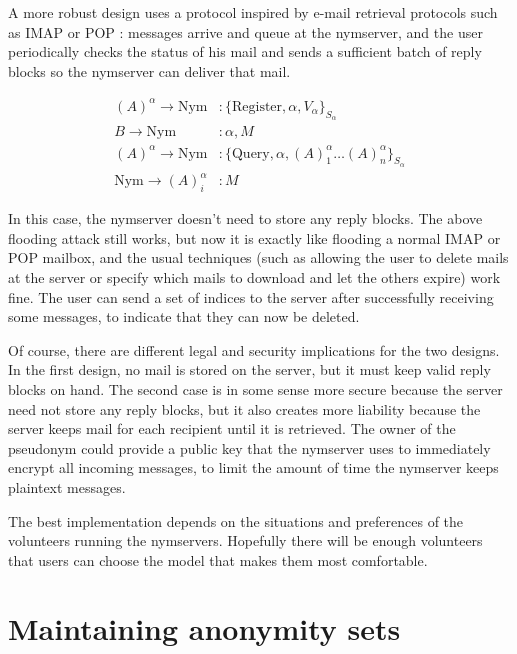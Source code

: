 \documentclass[11pt]{IEEEtran}
\begin{document}
A more robust design uses a protocol inspired by e-mail retrieval
protocols such as IMAP \cite{IMAP} or POP \cite{POP3}:
messages arrive and queue at the nymserver, and the user periodically
checks the status of his mail and sends a sufficient batch of reply
blocks so the nymserver can deliver that mail.

\begin{equation}
\begin{aligned}
(A)^\alpha \rightarrow \mathrm{Nym}&: \{\mathrm{Register} , \alpha, V_{\alpha}\}_{S_{\alpha}}\\
B \rightarrow \mathrm{Nym}&: \alpha, M \\
(A)^\alpha \rightarrow \mathrm{Nym}&: \{\mathrm{Query} ,\alpha, (A)^\alpha_1 \dots
(A)^\alpha_n\}_{S_{\alpha}} \\
\mathrm{Nym} \rightarrow (A)^\alpha_i&: M
\end{aligned}
\end{equation}

In this case, the nymserver doesn't need to store any reply blocks.
The above flooding attack still works, but now it is exactly
like flooding a normal IMAP or POP mailbox, and the usual techniques (such as
allowing the user to delete mails at the server or specify which mails to
download and let the others expire) work fine. The user can send a set
of indices to the server after successfully receiving
some messages, to indicate that they can now be deleted.

Of course, there are different legal and security implications for the two
designs. In the first design, no mail is stored on the server, but it must
keep valid reply blocks on hand. The second case is in some sense more
secure because the server need not store any reply blocks, but it also
creates more liability because the server keeps mail for each recipient
until it is retrieved. The owner of the pseudonym could provide a public
key that the nymserver uses to immediately encrypt all incoming messages,
to limit the amount of time the nymserver keeps plaintext messages.

The best implementation depends on the situations and preferences of
the volunteers running the nymservers. Hopefully there will be enough
volunteers that users can choose the model that makes them most
comfortable.


\section{Maintaining anonymity sets}
\label{sec:maintaining-anonymity}
\end{document}
